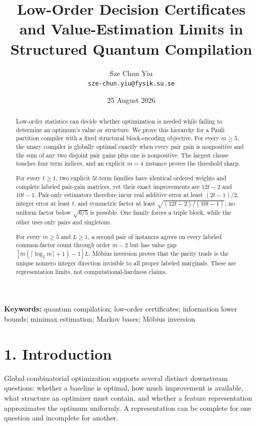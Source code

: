 \documentclass[
  11pt,
]{article}
\title{Low-Order Decision Certificates and Value-Estimation Limits in Structured Quantum Compilation}
\author{Sze Chun Yiu\\\texttt{sze-chun.yiu@fysik.su.se}}
\date{25 August 2026}
\begin{document}
\maketitle

\begin{abstract}
Low-order statistics can decide whether optimization is needed while
failing to determine an optimum's value or structure. We prove this
hierarchy for a Pauli partition compiler with a fixed structural
block-encoding objective. For every \(m\ge5\), the unary compiler is
globally optimal exactly when every pair gain is nonpositive and the sum
of any two disjoint pair gains plus one is nonpositive. The largest
clause touches four term indices, and an explicit \(m=4\) instance
proves the threshold sharp.

For every \(t\ge1\), two explicit \(5t\)-term families have identical
ordered weights and complete labeled pair-gain matrices, yet their exact
improvements are \(12t-2\) and \(10t-1\). Pair-only estimators therefore
incur real additive error at least \((2t-1)/2\), integer error at least
\(t\), and symmetric factor at least \(\sqrt{(12t-2)/(10t-1)}\); no
uniform factor below \(\sqrt{6/5}\) is possible. One family forces a
triple block, while the other uses only pairs and singletons.

For every \(m\ge5\) and \(L\ge1\), a second pair of instances agrees on
every labeled common-factor count through order \(m-2\) but has value
gap \([m(\lceil\log_2m\rceil+1)-1]L\). Möbius inversion proves that the
parity trade is the unique nonzero integer direction invisible to all
proper labeled marginals. These are representation limits, not
computational-hardness claims.

\end{abstract}

\noindent\textbf{Keywords:} quantum compilation; low-order certificates;
information lower bounds; minimax estimation; Markov bases; Möbius
inversion

\hypertarget{introduction}{%
\section{1. Introduction}\label{introduction}}

Global combinatorial optimization supports several distinct downstream
questions: whether a baseline is optimal, how much improvement is
available, what structure an optimizer must contain, and whether a
feature representation approximates the optimum uniformly. A
representation can be complete for one question and incomplete for
another.
\end{document}
